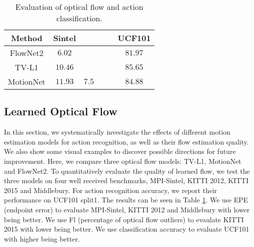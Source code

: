 \documentclass[runningheads]{llncs}
\begin{document}
		\begin{table}[t]
			\begin{center}\caption{Evaluation of optical flow and action classification. \color{black}{For flow evaluation, lower error is better. For action recognition, higher accuracy is better.} \label{tab:learned_flow_quality}}
\begin{tabular}{  c | c | c | c | c || c }
						\hline
						Method	    	&   Sintel  &  \color{black}{KITTI2012}  &  \color{black}{KITTI2015}  &  \color{black}{Middlebury}  & UCF101 \\
						\hline
						\hline
						FlowNet2			&   $\mathbf{6.02}$  	&   \color{black}{$\mathbf{1.8}$}  	&   \color{black}{$\mathbf{11.48}$}  	&   \color{black}{$0.52$}  	 									&    $81.97$ \\
						TV-L1 					&   $10.46$   					&   \color{black}{$14.6$} 					&   \color{black}{$47.64$}   							&   \color{black}{$\mathbf{0.45}$}  					&    $\mathbf{85.65}$ \\
						MotionNet			&   $11.93$  					&  \color{black} {$7.5$}  					&   \color{black}{$30.65$}  							&   \color{black}{$0.91$ } 								&    $84.88$ \\
						\hline
					\end{tabular}
\end{center}
		\end{table} 
		
		
		
		
		
		\subsection{Learned Optical Flow} 
		\label{sec:learned_optical_flow}
		In this section, we systematically investigate the effects of different motion estimation models for action recognition, {\color{black}as well as their flow estimation quality}. We also show some visual examples to discover possible directions for future improvement. 
		Here, we compare three optical flow models: TV-L1, MotionNet and FlowNet2. To quantitatively evaluate the quality of learned flow, we test the three models on {\color{black}four} well received benchmarks, MPI-Sintel, {\color{black}KITTI 2012,  KITTI 2015 and Middlebury}. For action recognition accuracy, we report their performance on UCF101 split1. The results can be seen in Table \ref{tab:learned_flow_quality}. {\color{black}We use EPE (endpoint error) to evaluate MPI-Sintel, KITTI 2012 and Middlebury with lower being better. We use Fl (percentage of optical flow outliers) to evaulate KITTI 2015 with lower being better.  We use classification accuracy to evaluate UCF101 with higher being better.}
		
\end{document}
